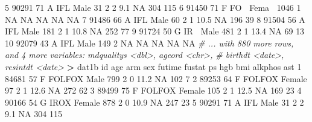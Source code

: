 \documentclass[
]{book}
\newenvironment{Shaded}{\begin{snugshade}}{\end{snugshade}}
\newcommand{\CommentTok}[1]{\textcolor[rgb]{0.56,0.35,0.01}{\textit{#1}}}
\newcommand{\DecValTok}[1]{\textcolor[rgb]{0.00,0.00,0.81}{#1}}
\newcommand{\FloatTok}[1]{\textcolor[rgb]{0.00,0.00,0.81}{#1}}
\newcommand{\NormalTok}[1]{#1}
\newcommand{\OperatorTok}[1]{\textcolor[rgb]{0.81,0.36,0.00}{\textbf{#1}}}
\newcommand{\OtherTok}[1]{\textcolor[rgb]{0.56,0.35,0.01}{#1}}
\newcommand{\StringTok}[1]{\textcolor[rgb]{0.31,0.60,0.02}{#1}}
\begin{document}
\begin{Shaded}
\begin{Highlighting}[]
 \DecValTok{5} \DecValTok{90291}    \DecValTok{71}\NormalTok{ A IFL Male      }\DecValTok{31}      \DecValTok{2}     \DecValTok{2}   \FloatTok{9.1}    \OtherTok{NA}     \DecValTok{304}   \DecValTok{115}
 \DecValTok{6} \DecValTok{91450}    \DecValTok{71}\NormalTok{ F FO}\OperatorTok{~}\StringTok{ }\NormalTok{Fema}\OperatorTok{~}\StringTok{   }\DecValTok{1046}      \DecValTok{1}    \OtherTok{NA}  \OtherTok{NA}      \OtherTok{NA}      \OtherTok{NA}    \OtherTok{NA}
 \DecValTok{7} \DecValTok{91486}    \DecValTok{66}\NormalTok{ A IFL Male      }\DecValTok{60}      \DecValTok{2}     \DecValTok{1}  \FloatTok{10.5}    \OtherTok{NA}     \DecValTok{196}    \DecValTok{39}
 \DecValTok{8} \DecValTok{91504}    \DecValTok{56}\NormalTok{ A IFL Male     }\DecValTok{181}      \DecValTok{2}     \DecValTok{1}  \FloatTok{10.8}    \OtherTok{NA}     \DecValTok{252}    \DecValTok{77}
 \DecValTok{9} \DecValTok{91724}    \DecValTok{50}\NormalTok{ G IR}\OperatorTok{~}\StringTok{ }\NormalTok{Male     }\DecValTok{481}      \DecValTok{2}     \DecValTok{1}  \FloatTok{13.4}    \OtherTok{NA}      \DecValTok{69}    \DecValTok{13}
\DecValTok{10} \DecValTok{92079}    \DecValTok{43}\NormalTok{ A IFL Male     }\DecValTok{149}      \DecValTok{2}    \OtherTok{NA}  \OtherTok{NA}      \OtherTok{NA}      \OtherTok{NA}    \OtherTok{NA}
\CommentTok{# ... with 880 more rows, and 4 more variables: mdqualitys <dbl>, ageord <chr>,}
\CommentTok{#   birthdt <date>, resintdt <date>}
\OperatorTok{>}\StringTok{ }\NormalTok{dat1b}
\NormalTok{       id age      arm    sex futime fustat ps  hgb       bmi alkphos ast}
\DecValTok{1}   \DecValTok{84681}  \DecValTok{57}\NormalTok{ F FOLFOX   Male    }\DecValTok{799}      \DecValTok{2}  \DecValTok{0} \FloatTok{11.2}        \OtherTok{NA}     \DecValTok{102}   \DecValTok{7}
\DecValTok{2}   \DecValTok{89253}  \DecValTok{64}\NormalTok{ F FOLFOX Female     }\DecValTok{97}      \DecValTok{2}  \DecValTok{1} \FloatTok{12.6}        \OtherTok{NA}     \DecValTok{272}  \DecValTok{62}
\DecValTok{3}   \DecValTok{89499}  \DecValTok{75}\NormalTok{ F FOLFOX Female    }\DecValTok{105}      \DecValTok{2}  \DecValTok{1} \FloatTok{12.5}        \OtherTok{NA}     \DecValTok{169}  \DecValTok{23}
\DecValTok{4}   \DecValTok{90166}  \DecValTok{54}\NormalTok{   G IROX Female    }\DecValTok{878}      \DecValTok{2}  \DecValTok{0} \FloatTok{10.9}        \OtherTok{NA}     \DecValTok{247}  \DecValTok{23}
\DecValTok{5}   \DecValTok{90291}  \DecValTok{71}\NormalTok{    A IFL   Male     }\DecValTok{31}      \DecValTok{2}  \DecValTok{2}  \FloatTok{9.1}        \OtherTok{NA}     \DecValTok{304} \DecValTok{115}

\end{Highlighting}
\end{Shaded}
\end{document}
